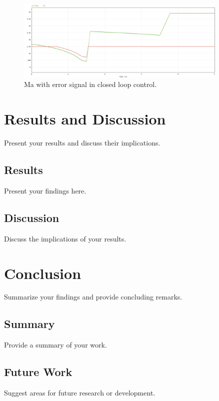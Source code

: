 \documentclass[12pt,a4paper]{report}
\begin{document}
\begin{figure}[H]
    \centering
    \includegraphics[width=0.9\textwidth]{2CModulation.png}
    \caption{Ma with error signal in closed loop control.}
    \label{fig:modulation-strategy}
\end{figure}

\chapter{Results and Discussion}
\label{ch:results}

Present your results and discuss their implications.

\section{Results}
Present your findings here.

\section{Discussion}
Discuss the implications of your results.

\chapter{Conclusion}
\label{ch:conclusion}

Summarize your findings and provide concluding remarks.

\section{Summary}
Provide a summary of your work.

\section{Future Work}
Suggest areas for future research or development.

% 
% 

\end{document}
